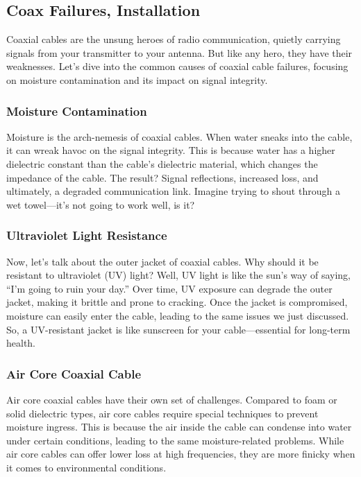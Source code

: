 \subsection{Coax Failures, Installation}
\label{subsec:coax-fail}

Coaxial cables are the unsung heroes of radio communication, quietly carrying signals from your transmitter to your antenna. But like any hero, they have their weaknesses. Let’s dive into the common causes of coaxial cable failures, focusing on moisture contamination and its impact on signal integrity.

\subsubsection*{Moisture Contamination}
Moisture is the arch-nemesis of coaxial cables. When water sneaks into the cable, it can wreak havoc on the signal integrity. This is because water has a higher dielectric constant than the cable's dielectric material, which changes the impedance of the cable. The result? Signal reflections, increased loss, and ultimately, a degraded communication link. Imagine trying to shout through a wet towel—it’s not going to work well, is it?

\subsubsection*{Ultraviolet Light Resistance}
Now, let’s talk about the outer jacket of coaxial cables. Why should it be resistant to ultraviolet (UV) light? Well, UV light is like the sun’s way of saying, “I’m going to ruin your day.” Over time, UV exposure can degrade the outer jacket, making it brittle and prone to cracking. Once the jacket is compromised, moisture can easily enter the cable, leading to the same issues we just discussed. So, a UV-resistant jacket is like sunscreen for your cable—essential for long-term health.

\subsubsection*{Air Core Coaxial Cable}
Air core coaxial cables have their own set of challenges. Compared to foam or solid dielectric types, air core cables require special techniques to prevent moisture ingress. This is because the air inside the cable can condense into water under certain conditions, leading to the same moisture-related problems. While air core cables can offer lower loss at high frequencies, they are more finicky when it comes to environmental conditions.

